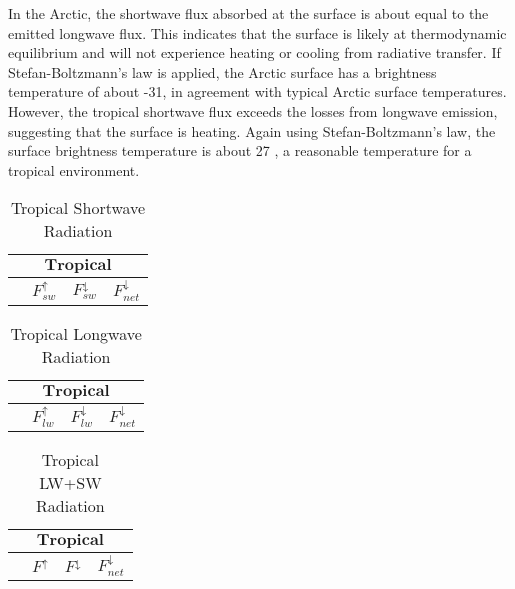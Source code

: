 \documentclass[twocol]{ametsoc}
\begin{document}
In the Arctic, the shortwave flux absorbed at the surface is about equal to the emitted longwave flux. This indicates that the surface is likely at thermodynamic equilibrium and will not experience heating or cooling from radiative transfer. If Stefan-Boltzmann’s law is applied, the Arctic surface has a brightness temperature of about -31, in agreement with typical Arctic surface temperatures. However, the tropical shortwave flux exceeds the losses from longwave emission, suggesting that the surface is heating. Again using Stefan-Boltzmann’s law, the surface brightness temperature is about 27 , a reasonable temperature for a tropical environment.

\begin{table}[h]
    \centering
    \caption{Tropical Shortwave Radiation}
    \label{tab:tsr}
    \begin{tabular}{lccc}
        \toprule
        \multicolumn{4}{c}{$\textbf{Tropical}$}\\
        \midrule
        & $F^\uparrow_{sw}$ & $F^\downarrow_{sw}$ & $F^\downarrow_{net}$\\
        \midrule
        
        \bottomrule
    \end{tabular}
\end{table}
\begin{table}[h]
    \centering
    \caption{Tropical Longwave Radiation}
    \label{tab:tlr}
    \begin{tabular}{lccc}
        \toprule
        \multicolumn{4}{c}{$\textbf{Tropical}$}\\
        \midrule
        & $F^\uparrow_{lw}$ & $F^\downarrow_{lw}$ & $F^\downarrow_{net}$\\
        \midrule
        
        \bottomrule
    \end{tabular}

\end{table}
\begin{table}[h]
    \centering
    \caption{Tropical LW+SW Radiation}
    \label{tab:tcr}
    \begin{tabular}{lccc}
        \toprule
        \multicolumn{4}{c}{$\textbf{Tropical}$}\\
        \midrule
        & $F^\uparrow$ & $F^\downarrow$ & $F^\downarrow_{net}$\\
        \midrule
        
        \bottomrule
    \end{tabular}

\end{table}
\end{document}
